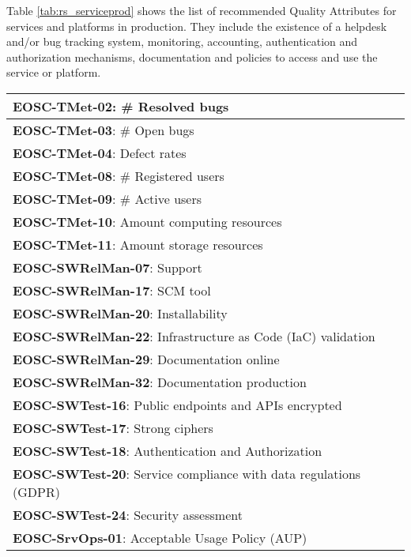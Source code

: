 Table \ref{tab:rs_serviceprod} shows the list of recommended Quality Attributes for services and platforms in production. They include the existence of a helpdesk and/or bug tracking system, monitoring, accounting, authentication and authorization mechanisms, documentation and policies to access and use the service or platform.

\begin{center}
\begin{table}[h]
    \small
    \begin{tabular}{|p{\linewidth}|} \hline

        \textbf{EOSC-TMet-02}: \# Resolved bugs \\ \hline
        \textbf{EOSC-TMet-03}: \# Open bugs \\ \hline
        \textbf{EOSC-TMet-04}: Defect rates \\ \hline
        \textbf{EOSC-TMet-08}: \# Registered users \\ \hline
        \textbf{EOSC-TMet-09}: \# Active users \\ \hline
        \textbf{EOSC-TMet-10}: Amount computing resources \\ \hline
        \textbf{EOSC-TMet-11}: Amount storage resources \\ \hline
        \textbf{EOSC-SWRelMan-07}: Support \\ \hline
        \textbf{EOSC-SWRelMan-17}: SCM tool \\ \hline
        \textbf{EOSC-SWRelMan-20}: Installability \\ \hline
        \textbf{EOSC-SWRelMan-22}: Infrastructure as Code (IaC) validation \\ \hline
        \textbf{EOSC-SWRelMan-29}: Documentation online \\ \hline
        \textbf{EOSC-SWRelMan-32}: Documentation production \\ \hline
        \textbf{EOSC-SWTest-16}: Public endpoints and APIs encrypted \\ \hline
        \textbf{EOSC-SWTest-17}: Strong ciphers \\ \hline
        \textbf{EOSC-SWTest-18}: Authentication and Authorization \\ \hline
        \textbf{EOSC-SWTest-20}: Service compliance with data regulations (GDPR) \\ \hline
        \textbf{EOSC-SWTest-24}: Security assessment \\ \hline
        \textbf{EOSC-SrvOps-01}: Acceptable Usage Policy (AUP) \\ \hline

\end{tabular}
\end{table}
\end{center}
